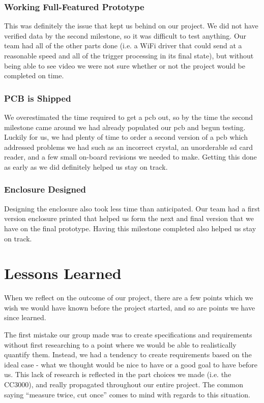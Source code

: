 \documentclass[12pt]{article}
\begin{document}
\subsubsection{Working Full-Featured Prototype}
This was definitely the issue that kept us behind on our project. We did not
have verified data by the second milestone, so it was difficult to test
anything. Our team had all of the other parts done (i.e. a WiFi driver that
could send at a reasonable speed and all of the trigger processing in its final
state), but without being able to see video we were not sure whether or not the
project would be completed on time.

\subsubsection{PCB is Shipped}
We overestimated the time required to get a \gls{pcb} out, so by the time the
second milestone came around we had already populated our \gls{pcb} and begun
testing.  Luckily for us, we had plenty of time to order a second version of a
\gls{pcb} which addressed problems we had such as an incorrect crystal, an
unorderable \gls{sd} card reader, and a few small on-board revisions we needed
to make. Getting this done as early as we did definitely helped us stay on
track.

\subsubsection{Enclosure Designed}
Designing the enclosure also took less time than anticipated. Our team had a
first version enclosure printed that helped us form the next and final version
that we have on the final prototype. Having this milestone completed also
helped us stay on track.

\section{Lessons Learned}
When we reflect on the outcome of our project, there are a few points which we
wish we would have known before the project started, and so are points we have
since learned. 

The first mistake our group made was to create specifications and requirements
without first researching to a point where we would be able to realistically
quantify them. Instead, we had a tendency to create requirements based on the
ideal case - what we thought would be nice to have or a good goal to have
before us. This lack of research is reflected in the part choices we made (i.e.
the CC3000), and really propagated throughout our entire project. The common
saying ``measure twice, cut once'' comes to mind with regards to this
situation.
\end{document}
